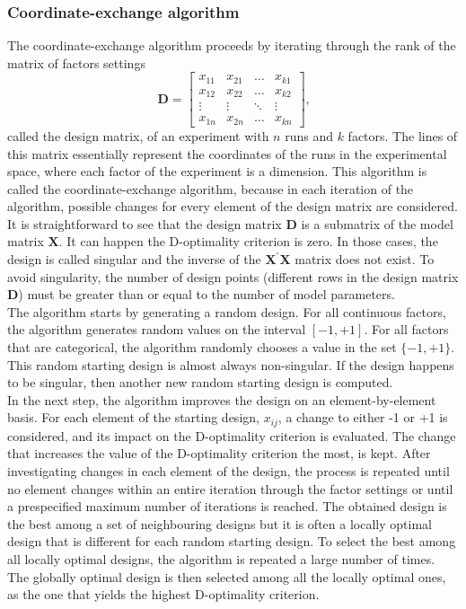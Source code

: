 \subsubsection{Coordinate-exchange algorithm}
The coordinate-exchange algorithm proceeds by iterating through the rank of the matrix of factors settings
\begin{equation}
\mathbf{D}= 
    \begin{bmatrix}
        x_{11} & x_{21} & \ldots & x_{k1} \\
        x_{12} & x_{22} & \ldots & x_{k2} \\
        \vdots & \vdots & \ddots & \vdots \\
        x_{1n} & x_{2n} & \ldots & x_{kn} 
    \end{bmatrix}
    \text{,}
    \label{mat:design_matrix}
\end{equation}
called the design matrix, of an experiment with $n$ runs and $k$ factors. The lines of this matrix essentially represent the coordinates of the runs in the experimental space, where each factor of the experiment is a dimension. This algorithm is called the coordinate-exchange algorithm, because in each iteration of the algorithm, possible changes for every element of the design matrix are considered. \\
It is straightforward to see that the design matrix $\mathbf{D}$ is a submatrix of the model matrix $\mathbf{X}$. It can happen the D-optimality criterion is zero. In those cases, the design is called singular and the inverse of the $\mathbf{X}^{\prime}\mathbf{X}$ matrix does not exist. To avoid singularity, the number of design points (different rows in the design matrix $\mathbf{D}$) must be greater than or equal to the number of model parameters.\\

The algorithm starts by generating a random design. For all continuous factors, the algorithm generates random values on the interval $[-1,+1]$. For all factors that are categorical, the algorithm randomly chooses a value in the set $\{-1,+1\}$. This random starting design is almost always non-singular. If the design happens to be singular, then another new random starting design is computed.\\
In the next step, the algorithm improves the design on an element-by-element basis. For each element of the starting design, $x_{ij}$, a change to either -1 or +1 is considered, and its impact on the D-optimality criterion is evaluated. The change that increases the value of the D-optimality criterion the most, is kept. After investigating changes in each element of the design, the process is repeated until no element changes within an entire iteration through the factor settings or until a prespecified maximum number of iterations is reached. The obtained design is the best among a set of neighbouring designs but it is often a locally optimal design that is different for each random starting design. To select the best among all locally optimal designs, the algorithm is repeated a large number of times. The globally optimal design is then selected among all the locally optimal ones, as the one that yields the highest D-optimality criterion.

